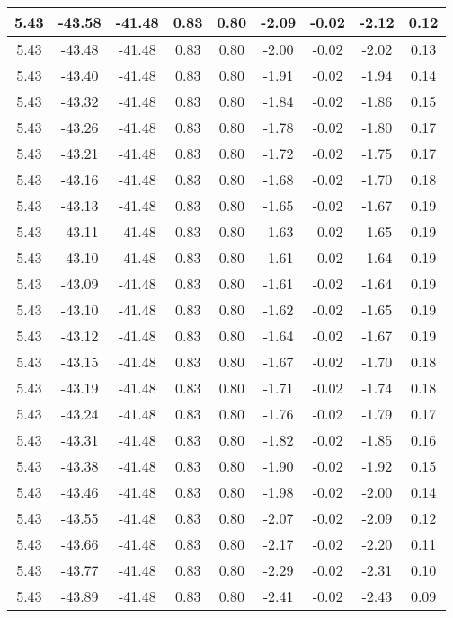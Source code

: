 \begin{table}[htbp]
\begin{adjustbox}{angle=90}
\begin{tabular}{|c|c|c|c|c|c|c|c|c|}
 5.43 & -43.58 & -41.48 & 0.83 & 0.80 & -2.09 & -0.02 & -2.12 & 0.12\\ \hline
 5.43 & -43.48 & -41.48 & 0.83 & 0.80 & -2.00 & -0.02 & -2.02 & 0.13\\ \hline
 5.43 & -43.40 & -41.48 & 0.83 & 0.80 & -1.91 & -0.02 & -1.94 & 0.14\\ \hline
 5.43 & -43.32 & -41.48 & 0.83 & 0.80 & -1.84 & -0.02 & -1.86 & 0.15\\ \hline
 5.43 & -43.26 & -41.48 & 0.83 & 0.80 & -1.78 & -0.02 & -1.80 & 0.17\\ \hline
 5.43 & -43.21 & -41.48 & 0.83 & 0.80 & -1.72 & -0.02 & -1.75 & 0.17\\ \hline
 5.43 & -43.16 & -41.48 & 0.83 & 0.80 & -1.68 & -0.02 & -1.70 & 0.18\\ \hline
 5.43 & -43.13 & -41.48 & 0.83 & 0.80 & -1.65 & -0.02 & -1.67 & 0.19\\ \hline
 5.43 & -43.11 & -41.48 & 0.83 & 0.80 & -1.63 & -0.02 & -1.65 & 0.19\\ \hline
 5.43 & -43.10 & -41.48 & 0.83 & 0.80 & -1.61 & -0.02 & -1.64 & 0.19\\ \hline
 5.43 & -43.09 & -41.48 & 0.83 & 0.80 & -1.61 & -0.02 & -1.64 & 0.19\\ \hline
 5.43 & -43.10 & -41.48 & 0.83 & 0.80 & -1.62 & -0.02 & -1.65 & 0.19\\ \hline
 5.43 & -43.12 & -41.48 & 0.83 & 0.80 & -1.64 & -0.02 & -1.67 & 0.19\\ \hline
 5.43 & -43.15 & -41.48 & 0.83 & 0.80 & -1.67 & -0.02 & -1.70 & 0.18\\ \hline
 5.43 & -43.19 & -41.48 & 0.83 & 0.80 & -1.71 & -0.02 & -1.74 & 0.18\\ \hline
 5.43 & -43.24 & -41.48 & 0.83 & 0.80 & -1.76 & -0.02 & -1.79 & 0.17\\ \hline
 5.43 & -43.31 & -41.48 & 0.83 & 0.80 & -1.82 & -0.02 & -1.85 & 0.16\\ \hline
 5.43 & -43.38 & -41.48 & 0.83 & 0.80 & -1.90 & -0.02 & -1.92 & 0.15\\ \hline
 5.43 & -43.46 & -41.48 & 0.83 & 0.80 & -1.98 & -0.02 & -2.00 & 0.14\\ \hline
 5.43 & -43.55 & -41.48 & 0.83 & 0.80 & -2.07 & -0.02 & -2.09 & 0.12\\ \hline
 5.43 & -43.66 & -41.48 & 0.83 & 0.80 & -2.17 & -0.02 & -2.20 & 0.11\\ \hline
 5.43 & -43.77 & -41.48 & 0.83 & 0.80 & -2.29 & -0.02 & -2.31 & 0.10\\ \hline
 5.43 & -43.89 & -41.48 & 0.83 & 0.80 & -2.41 & -0.02 & -2.43 & 0.09\\ \hline

\end{tabular}
\end{adjustbox}
\end{table}
